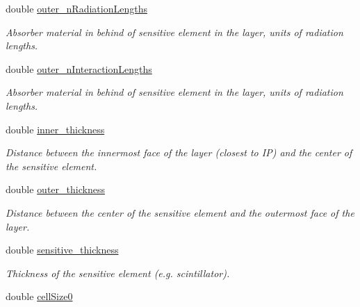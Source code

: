 \begin{DoxyCompactItemize}
double \hyperlink{struct_d_d4hep_1_1_d_d_rec_1_1_layered_calorimeter_struct_1_1_layer_af46a77937ad8427edb903e291e5370fd}{outer\_\-nRadiationLengths}
\begin{DoxyCompactList}\small\item\em Absorber material in behind of sensitive element in the layer, units of radiation lengths. \item\end{DoxyCompactList}\item 
double \hyperlink{struct_d_d4hep_1_1_d_d_rec_1_1_layered_calorimeter_struct_1_1_layer_abf4dac9dd33fe0ac0eeb033bd0daa420}{outer\_\-nInteractionLengths}
\begin{DoxyCompactList}\small\item\em Absorber material in behind of sensitive element in the layer, units of radiation lengths. \item\end{DoxyCompactList}\item 
double \hyperlink{struct_d_d4hep_1_1_d_d_rec_1_1_layered_calorimeter_struct_1_1_layer_a93e6705275f50921dbc1d816bcbd5f73}{inner\_\-thickness}
\begin{DoxyCompactList}\small\item\em Distance between the innermost face of the layer (closest to IP) and the center of the sensitive element. \item\end{DoxyCompactList}\item 
double \hyperlink{struct_d_d4hep_1_1_d_d_rec_1_1_layered_calorimeter_struct_1_1_layer_aad0fde2a5b642bc6dd0ff6a08a594da0}{outer\_\-thickness}
\begin{DoxyCompactList}\small\item\em Distance between the center of the sensitive element and the outermost face of the layer. \item\end{DoxyCompactList}\item 
double \hyperlink{struct_d_d4hep_1_1_d_d_rec_1_1_layered_calorimeter_struct_1_1_layer_af1137d1b807db356fee6095e24aa5cea}{sensitive\_\-thickness}
\begin{DoxyCompactList}\small\item\em Thickness of the sensitive element (e.g. scintillator). \item\end{DoxyCompactList}\item 
double \hyperlink{struct_d_d4hep_1_1_d_d_rec_1_1_layered_calorimeter_struct_1_1_layer_a648ec7174a8858e289b87214835d2fbf}{cellSize0}

\end{DoxyCompactItemize}
